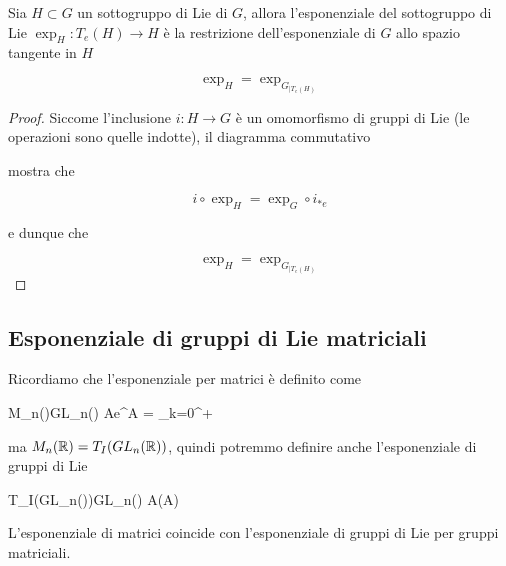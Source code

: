 \begin{corollary}
	Sia $ H \subset G $ un sottogruppo di Lie di $ G $, allora l'esponenziale del sottogruppo di Lie $ \exp_{H} : T_{e}(H) \to H $ è la restrizione dell'esponenziale di $ G $ allo spazio tangente in $ H $
	
	\begin{equation}
		\exp_{H} = \exp_{G_{| T_{e}(H)}}
	\end{equation}
\end{corollary}

\begin{proof}
	Siccome l'inclusione $ i : H \to G $ è un omomorfismo di gruppi di Lie (le operazioni sono quelle indotte), il diagramma commutativo
	
	
	mostra che
	
	\begin{equation}
		i \circ \exp_{H} = \exp_{G} \circ i_{*e}
	\end{equation}

	e dunque che
	
	\begin{equation}
		\exp_{H} = \exp_{G_{| T_{e}(H)}}
	\end{equation}
\end{proof}

\subsection{Esponenziale di gruppi di Lie matriciali}

Ricordiamo che l'esponenziale per matrici è definito come

%
	{M_{n}(\R)}{GL_{n}(\R)}%
	{A}{e^{A} = \sum_{k=0}^{+\infty} }

ma $ M_{n}(\mathbb{R}) = T_{I}(GL_{n}(\mathbb{R})) $, quindi potremmo definire anche l'esponenziale di gruppi di Lie

\map{\exp}%
	{T_{I}(GL_{n}(\R))}{GL_{n}(\R)}%
	{A}{\exp(A)}

\begin{corollary}
	L'esponenziale di matrici coincide con l'esponenziale di gruppi di Lie per gruppi matriciali.
\end{corollary}

